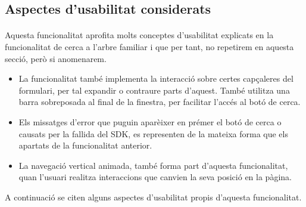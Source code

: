 \subsection{Aspectes d'usabilitat considerats}

    \paragraph{}
    Aquesta funcionalitat aprofita molts conceptes d'usabilitat explicats en la funcionalitat de cerca a l’arbre familiar i que per tant, no repetirem en aquesta secció, però si anomenarem.

    \begin{itemize}
        \item La funcionalitat també implementa la interacció sobre certes capçaleres del formulari, per tal expandir o contraure parts d'aquest. També utilitza una barra sobreposada al final de la finestra, per facilitar l'accés al botó de cerca.
        \item Els missatges d'error que puguin aparèixer en prémer el botó de cerca o causats per la fallida del SDK, es representen de la mateixa forma que els apartats de la funcionalitat anterior.
        \item La navegació vertical animada, també forma part d'aquesta funcionalitat, quan l'usuari realitza interaccions que canvien la seva posició en la pàgina.
    \end{itemize}

    A continuació se citen alguns aspectes d'usabilitat propis d'aquesta funcionalitat.

    
    
